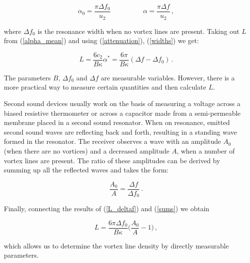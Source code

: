 \begin{equation}
\alpha_0 = \frac{\pi \Delta f_0}{u_2}
\hspace{2cm}
\alpha = \frac{\pi \Delta f}{u_2}\,,
\label{widths}
\end{equation}

where $\Delta f_0$ is the resonance width when no vortex lines are present. Taking out $L$ from (\ref{alpha_mean}) and using (\ref{attenuation}), (\ref{widths}) we get:

\begin{equation}
L
= \frac{6 c_2}{B \kappa} \alpha^*
= \frac{6\pi}{B\kappa} (\Delta f - \Delta f_0)\,.
\label{L_deltaf}
\end{equation}

The parameters $B$, $\Delta f_0$ and $\Delta f$ are measurable variables. However, there is a more practical way to measure certain quantities and then calculate $L$.

Second sound devices usually work on the basis of measuring a voltage across a biased resistive thermometer or across a capacitor made from a semi-permeable membrane placed in a second sound resonator. When on resonance, emitted second sound waves are reflecting back and forth, resulting in a standing wave formed in the resonator. The receiver observes a wave with an amplitude $A_0$ (when there are no vortices) and a decreased amplitude $A$, when a number of vortex lines are present.  The ratio of these amplitudes can be derived by summing up all the reflected waves and takes the form\cite{physrevB}:

\begin{equation}
\frac{A_0}{A}
= \frac{\Delta f}{\Delta f_0}\,.
\label{sums}
\end{equation}

Finally, connecting the results of (\ref{L_deltaf}) and (\ref{sums}) we obtain

\begin{equation}
L = \frac{6\pi \Delta f_0}{B\kappa}\bigg( \frac{A_0}{A} - 1 \bigg)\,,
\label{L}
\end{equation}

which allows us to determine the vortex line density by directly measurable parameters.


















